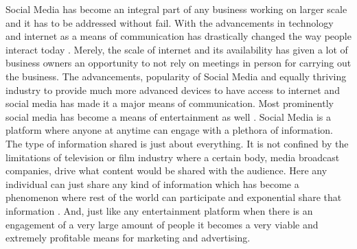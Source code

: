\documentclass[sigconf]{acmart}
\begin{document}
Social Media has become an integral part of any business working on larger scale and it has to be addressed without fail. With the advancements in technology and internet as a means of communication has drastically changed the way people interact today \cite{nickhajli}. Merely, the scale of internet and its availability has given a lot of business owners an opportunity to not rely on meetings in person for carrying out the business. The advancements, popularity of Social Media and equally thriving industry to provide much more advanced devices to have access to internet and social media has made it a major means of communication. Most prominently social media has become a means of entertainment as well \cite{clee}. Social Media is a platform where anyone at anytime can engage with a plethora of information. The type of information shared is just about everything. It is not confined by the limitations of television or film industry where a certain body, media broadcast companies, drive what content would be shared with the audience. Here any individual can just share any kind of information which has become a phenomenon where rest of the world can participate and exponential share that information \cite{clee}. And, just like any entertainment platform when there is an engagement of a very large amount of people it becomes a very viable and extremely profitable means for marketing and advertising.
\end{document}
